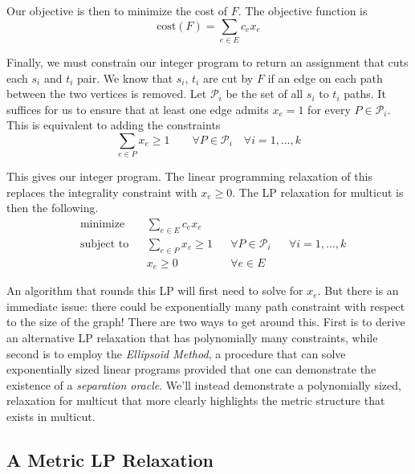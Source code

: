 Our objective is then to minimize the cost of $F$. The objective function is
\begin{equation*}
\text{cost}(F) = \sum_{e \in E} c_e x_e
\end{equation*}

Finally, we must constrain our integer program to return an assignment that cuts each $s_i$ and $t_i$ pair. We know that $s_i$, $t_i$ are cut by $F$ if an edge on each path between the two vertices is removed. Let $\mathcal{P}_i$ be the set of all $s_i$ to $t_i$ paths. It suffices for us to ensure that at least one edge admits $x_e = 1$ for every $P \in \mathcal{P}_i$. This is equivalent to adding the constraints
\begin{equation*}
\sum_{e \in P} x_e \geq 1
\qquad \forall P \in \mathcal{P}_i \quad \forall i = 1, \ldots, k
\end{equation*}

This gives our integer program. The linear programming relaxation of this replaces the integrality constraint with $x_e \geq 0$. The LP relaxation for multicut is then the following.
\begin{equation}\label{eq:primal-lp}
\begin{aligned}
& \text{minimize}
& & \sum_{e \in E} c_e x_e & \\
& \text{subject to}
& & \sum_{e \in P} x_e \geq 1 & & \forall P \in \mathcal{P}_i & & \forall i = 1, \ldots, k \\
& & & x_e \geq 0 & & \forall e \in E
\end{aligned}
\end{equation}

An algorithm that rounds this LP will first need to solve for $x_e$. But there is an immediate issue: there could be exponentially many path constraint with respect to the size of the graph! There are two ways to get around this. First is to derive an alternative LP relaxation that has polynomially many constraints, while second is to employ the \emph{Ellipsoid Method}, a procedure that can solve exponentially sized linear programs provided that one can demonstrate the existence of a \emph{separation oracle}. We'll instead demonstrate a polynomially sized, relaxation for multicut that more clearly highlights the metric structure that exists in multicut.


\subsection{A Metric LP Relaxation}

